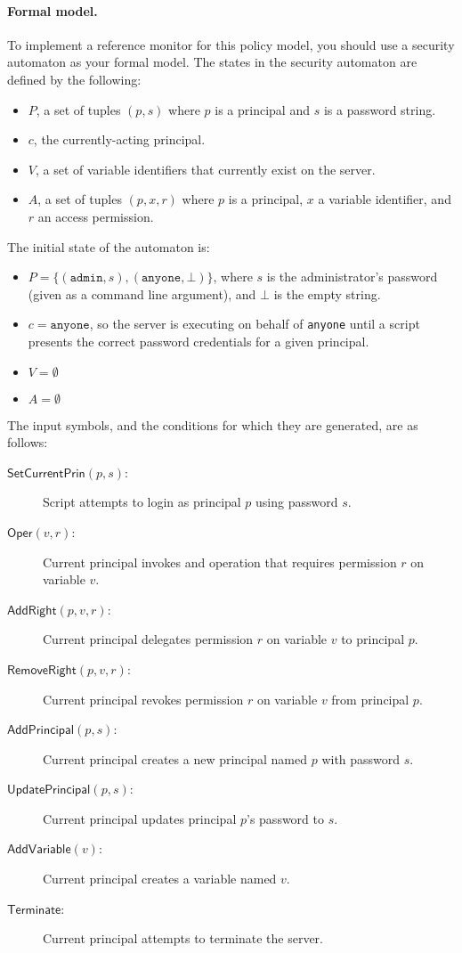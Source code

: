 \documentclass[11pt]{article}
\begin{document}
\paragraph{Formal model.}
To implement a reference monitor for this policy model, you should use a security automaton as your formal model. The states in the security automaton are defined by the following:
\begin{itemize}
	\item $P$, a set of tuples $(p, s)$ where $p$ is a principal and $s$ is a password string.
	\item $c$, the currently-acting principal.
	\item $V$, a set of variable identifiers that currently exist on the server.
	\item $A$, a set of tuples $(p, x, r)$ where $p$ is a principal, $x$ a variable identifier, and $r$ an access permission.
\end{itemize}
The initial state of the automaton is:
\begin{itemize}
\item $P = \{(\mathtt{admin}, s),(\mathtt{anyone}, \bot)\}$, where $s$ is the administrator's password (given as a command line argument), and $\bot$ is the empty string.
\item $c = \mathtt{anyone}$, so the server is executing on behalf of \texttt{anyone} until a script presents the correct password credentials for a given principal.
\item $V = \emptyset$
\item $A = \emptyset$
\end{itemize}

The input symbols, and the conditions for which they are generated, are as follows:
\begin{description}
	\item[$\mathsf{SetCurrentPrin}(p, s)$:]
	Script attempts to login as principal $p$ using password $s$.
	\item[$\mathsf{Oper}(v, r)$:]
	Current principal invokes and operation that requires permission $r$ on variable $v$.
	\item[$\mathsf{AddRight}(p, v, r)$:]
	Current principal delegates permission $r$ on variable $v$ to principal $p$.
	\item[$\mathsf{RemoveRight}(p, v, r)$:]
	Current principal revokes permission $r$ on variable $v$ from principal $p$.
	\item[$\mathsf{AddPrincipal}(p, s)$:]
	Current principal creates a new principal named $p$ with password $s$.
	\item[$\mathsf{UpdatePrincipal}(p, s)$:]
	Current principal updates principal $p$'s password to $s$.
	\item[$\mathsf{AddVariable}(v)$:]
	Current principal creates a variable named $v$.
	\item[$\mathsf{Terminate}$:]
	Current principal attempts to terminate the server.
\end{description}
\end{document}
